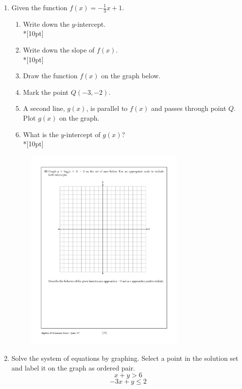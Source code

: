 \documentclass[12pt, oneside]{article}
\begin{document}
\begin{enumerate}
\newpage

\item Given the function $f(x)=-\frac{1}{3}x+1$. 
\begin{enumerate}
    \item Write down the $y$-intercept.\\*[10pt]
    \item Write down the slope of $f(x)$.\\*[10pt]
    \item Draw the function $f(x)$ on the graph below.
    \item Mark the point $Q (-3, -2)$.
    \item A second line, $g(x)$, is parallel to $f(x)$ and passes through point $Q$. Plot $g(x)$ on the graph.
    \item What is the $y$-intercept of $g(x)$?\\*[10pt]
\end{enumerate}

\begin{figure}[!ht]
    \centering
    \includegraphics[width=0.75\textwidth]{regents-grid.pdf}
\end{figure}

\newpage
\item Solve the system of equations by graphing. Select a point in the solution set and label it on the graph as ordered pair.
\[x+y>6\]
\[-3x+y \leq 2\]


\end{enumerate}
\end{document}
